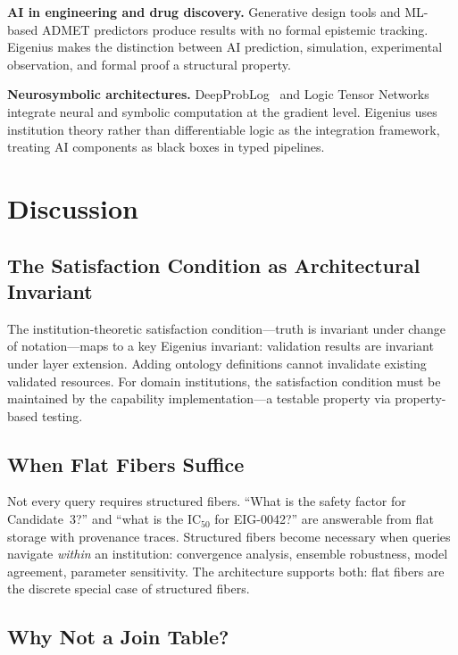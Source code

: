 \documentclass[10pt,twocolumn,letterpaper]{article}
\begin{document}
\textbf{AI in engineering and drug discovery.}
Generative design tools and ML-based ADMET predictors produce results with no formal epistemic tracking.
Eigenius makes the distinction between AI prediction, simulation, experimental observation, and formal proof a structural property.

\textbf{Neurosymbolic architectures.}
DeepProbLog~\cite{deepproblog} and Logic Tensor Networks~\cite{ltn} integrate neural and symbolic computation at the gradient level.
Eigenius uses institution theory rather than differentiable logic as the integration framework, treating AI components as black boxes in typed pipelines.


\section{Discussion}
\label{sec:discussion}

\subsection{The Satisfaction Condition as Architectural Invariant}

The institution-theoretic satisfaction condition---truth is invariant under change of notation---maps to a key Eigenius invariant: validation results are invariant under layer extension.
Adding ontology definitions cannot invalidate existing validated resources.
For domain institutions, the satisfaction condition must be maintained by the capability implementation---a testable property via property-based testing.

\subsection{When Flat Fibers Suffice}

Not every query requires structured fibers.
``What is the safety factor for Candidate~3?'' and ``what is the IC$_{50}$ for EIG-0042?'' are answerable from flat storage with provenance traces.
Structured fibers become necessary when queries navigate \emph{within} an institution: convergence analysis, ensemble robustness, model agreement, parameter sensitivity.
The architecture supports both: flat fibers are the discrete special case of structured fibers.

\subsection{Why Not a Join Table?}
\end{document}
